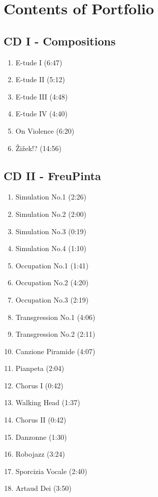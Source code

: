 \chapter*{Contents of Portfolio}
\hypertarget{portfolio}{}

\section*{CD I - Compositions}

\begin{enumerate}
\item E-tude I (6:47)
\item E-tude II (5:12)
\item E-tude III (4:48)
\item E-tude IV (4:40)
\item On Violence (6:20)
\item \v{Z}i\v{z}ek!? (14:56)
\end{enumerate}

\section*{CD II - FreuPinta}

\begin{enumerate}
\item Simulation No.1 (2:26)
\item Simulation No.2 (2:00)
\item Simulation No.3 (0:19)
\item Simulation No.4 (1:10)
\item Occupation No.1 (1:41)
\item Occupation No.2 (4:20)
\item Occupation No.3 (2:19)
\item Transgression No.1 (4:06)
\item Transgression No.2 (2:11)
\item Canzione Piramide (4:07)
\item Pianpeta (2:04)
\item Chorus I (0:42)
\item Walking Head (1:37)
\item Chorus II (0:42)
\item Danzonne (1:30)
\item Robojazz (3:24)
\item Sporcizia Vocale (2:40)
\item Artaud Dei (3:50)
\end{enumerate}


